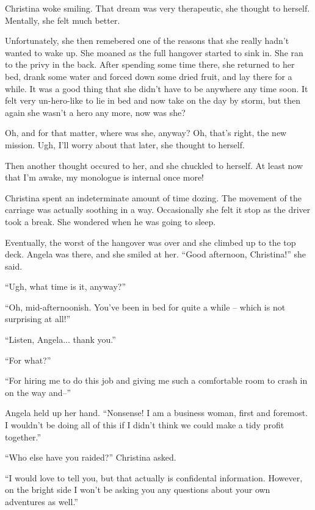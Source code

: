 \documentclass[showtrims,b6paper,draft,10pt]{memoir}
\begin{document}
\timeskip
Christina woke smiling.  That dream was very therapeutic, she thought to herself.  Mentally, she felt much better.

Unfortunately, she then remebered one of the reasons that she really hadn't wanted to wake up.  She moaned as the full hangover started to sink in.  She ran to the privy in the back.  After spending some time there, she returned to her bed, drank some water and forced down some dried fruit, and lay there for a while.  It was a good thing that she didn't have to be anywhere any time soon.  It felt very un-hero-like to lie in bed and now take on the day by storm, but then again she wasn't a hero any more, now was she?

Oh, and for that matter, where was she, anyway?  Oh, that's right, the new mission.  Ugh, I'll worry about that later, she thought to herself.

Then another thought occured to her, and she chuckled to herself.  At least now that I'm awake, my monologue is internal once more!

\timeskip
Christina spent an indeterminate amount of time dozing.  The movement of the carriage was actually soothing in a way.  Occasionally she felt it stop as the driver took a break.  She wondered when he was going to sleep.

Eventually, the worst of the hangover was over and she climbed up to the top deck.  Angela was there, and she smiled at her.  ``Good afternoon, Christina!''  she said.

``Ugh, what time is it, anyway?''

``Oh, mid-afternoonish.  You've been in bed for quite a while -- which is not surprising at all!''

``Listen, Angela... thank you.''

``For what?''

``For hiring me to do this job and giving me such a comfortable room to crash in on the way and--''

Angela held up her hand.  ``Nonsense!  I am a business woman, first and foremost.  I wouldn't be doing all of this if I didn't think we could make a tidy profit together.''

``Who else have you raided?''  Christina asked.

``I would love to tell you, but that actually is confidental information.  However, on the bright side I won't be asking you any questions about your own adventures as well.''
\end{document}
